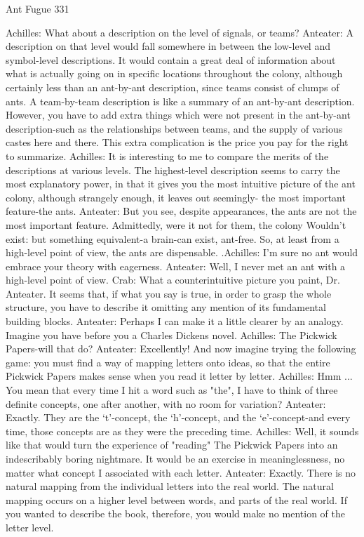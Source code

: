 Ant Fugue                                                                                  331

Achilles: What about a description on the level of signals, or teams?
Anteater: A description on that level would fall somewhere in between the low-level and
   symbol-level descriptions. It would contain a great deal of information about what is
   actually going on in specific locations throughout the colony, although certainly less
   than an ant-by-ant description, since teams consist of clumps of ants. A team-by-team
   description is like a summary of an ant-by-ant description. However, you have to add
   extra things which were not present in the ant-by-ant description-such as the
   relationships between teams, and the supply of various castes here and there. This
   extra complication is the price you pay for the right to summarize.
Achilles: It is interesting to me to compare the merits of the descriptions at various levels.
   The highest-level description seems to carry the most explanatory power, in that it
   gives you the most intuitive picture of the ant colony, although strangely enough, it
   leaves out seemingly- the most important feature-the ants.
Anteater: But you see, despite appearances, the ants are not the most important feature.
   Admittedly, were it not for them, the colony Wouldn't exist: but something
   equivalent-a brain-can exist, ant-free. So, at least from a high-level point of view, the
   ants are dispensable. .Achilles: I'm sure no ant would embrace your theory with
   eagerness.
Anteater: Well, I never met an ant with a high-level point of view.
Crab: What a counterintuitive picture you paint, Dr. Anteater. It seems that, if what you
   say is true, in order to grasp the whole structure, you have to describe it omitting any
   mention of its fundamental building blocks.
Anteater: Perhaps I can make it a little clearer by an analogy. Imagine you have before
   you a Charles Dickens novel.
Achilles: The Pickwick Papers-will that do?
Anteater: Excellently! And now imagine trying the following game: you must find a way
   of mapping letters onto ideas, so that the entire Pickwick Papers makes sense when
   you read it letter by letter.
Achilles: Hmm ... You mean that every time I hit a word such as "the", I have to think of
   three definite concepts, one after another, with no room for variation?
Anteater: Exactly. They are the `t'-concept, the `h'-concept, and the `e'-concept-and every
   time, those concepts are as they were the preceding time.
Achilles: Well, it sounds like that would turn the experience of "reading" The Pickwick
   Papers into an indescribably boring nightmare. It would be an exercise in
   meaninglessness, no matter what concept I associated with each letter.
Anteater: Exactly. There is no natural mapping from the individual letters into the real
   world. The natural mapping occurs on a higher level between words, and parts of the
   real world. If you wanted to describe the book, therefore, you would make no
   mention of the letter level.




